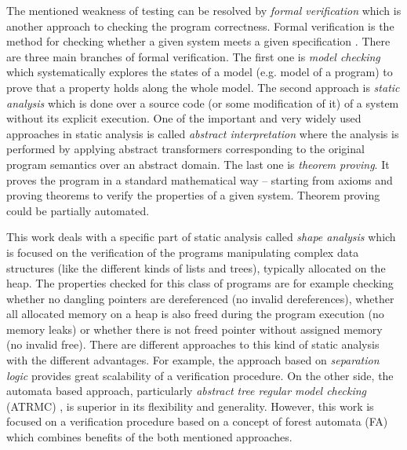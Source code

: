 \documentclass[fleqn,11pt]{ExcelAtFIT} %
\begin{document}
The mentioned weakness of testing can be resolved by \emph{formal verification}
which is another approach to checking the program correctness.
Formal verification is the method for checking whether a given system meets a given specification \cite{fav:lecture}.
There are three main branches of formal verification.
The first one is \emph{model checking} which systematically explores the states of a model (e.g. model of a program) to
prove that a property holds along the whole model.
The second approach is \emph{static analysis} which is done over a source code (or some modification of it) of a system
without its explicit execution.
One of the important and very widely used approaches in static analysis is called \emph{abstract interpretation} where the analysis is performed by
applying abstract transformers corresponding to the original program semantics over an abstract domain.
The last one is \emph{theorem proving}.
It proves the program in a standard mathematical way -- starting from axioms and proving theorems to
verify the properties of a given system.
Theorem proving could be partially automated.

This work deals with a specific part of static analysis called \emph{shape analysis} which is focused on the verification of the programs manipulating
complex data structures (like the different kinds of lists and trees), typically allocated on the heap.
The properties checked for this class of programs are for example checking whether no dangling
pointers are dereferenced (no invalid dereferences), whether all allocated memory on a heap is also freed
during the program execution (no memory leaks) or whether there is not freed pointer without assigned memory (no invalid free).
There are different approaches to this kind of static analysis with the different advantages.
For example, the approach based on \emph{separation logic} \cite{seplog,seplog07} provides great scalability of a verification procedure.
On the other side, the automata based approach, particularly \emph{abstract tree regular model checking} (ATRMC) \cite{artmc}, is
superior in its flexibility and generality.
However, this work is focused on a verification procedure based on a concept of forest automata (FA) which
combines benefits of the both mentioned approaches.
\end{document}
